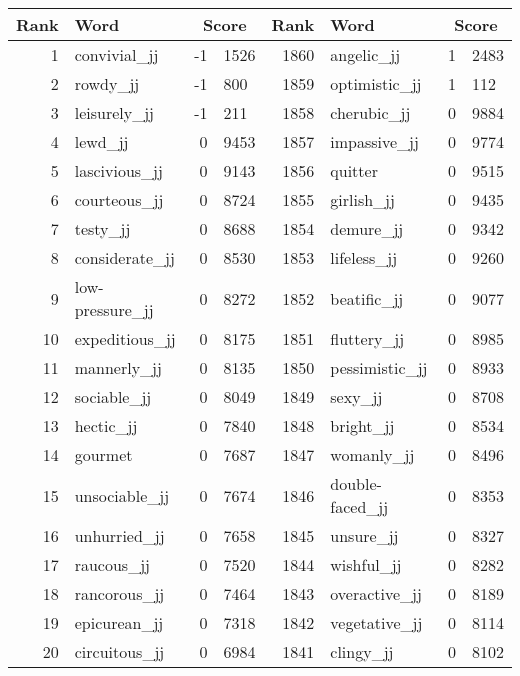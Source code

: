 \begin{table}[tbp]
    \begin{tabular}{| rlr@{.}l | rlr@{.}l |}
    \hline
    \textbf{Rank} & \textbf{Word} & \multicolumn{2}{c|}{\textbf{Score}} & \textbf{Rank} & \textbf{Word} & \multicolumn{2}{c|}{\textbf{Score}} \\
    \hline
    1 & convivial\_jj & -1 & 1526    &    1860 & angelic\_jj & 1 & 2483 \\
    2 & rowdy\_jj & -1 & 800    &    1859 & optimistic\_jj & 1 & 112 \\
    3 & leisurely\_jj & -1 & 211    &    1858 & cherubic\_jj & 0 & 9884 \\
    4 & lewd\_jj & 0 & 9453    &    1857 & impassive\_jj & 0 & 9774 \\
    5 & lascivious\_jj & 0 & 9143    &    1856 & quitter & 0 & 9515 \\
    6 & courteous\_jj & 0 & 8724    &    1855 & girlish\_jj & 0 & 9435 \\
    7 & testy\_jj & 0 & 8688    &    1854 & demure\_jj & 0 & 9342 \\
    8 & considerate\_jj & 0 & 8530    &    1853 & lifeless\_jj & 0 & 9260 \\
    9 & low-pressure\_jj & 0 & 8272    &    1852 & beatific\_jj & 0 & 9077 \\
    10 & expeditious\_jj & 0 & 8175    &    1851 & fluttery\_jj & 0 & 8985 \\
    11 & mannerly\_jj & 0 & 8135    &    1850 & pessimistic\_jj & 0 & 8933 \\
    12 & sociable\_jj & 0 & 8049    &    1849 & sexy\_jj & 0 & 8708 \\
    13 & hectic\_jj & 0 & 7840    &    1848 & bright\_jj & 0 & 8534 \\
    14 & gourmet & 0 & 7687    &    1847 & womanly\_jj & 0 & 8496 \\
    15 & unsociable\_jj & 0 & 7674    &    1846 & double-faced\_jj & 0 & 8353 \\
    16 & unhurried\_jj & 0 & 7658    &    1845 & unsure\_jj & 0 & 8327 \\
    17 & raucous\_jj & 0 & 7520    &    1844 & wishful\_jj & 0 & 8282 \\
    18 & rancorous\_jj & 0 & 7464    &    1843 & overactive\_jj & 0 & 8189 \\
    19 & epicurean\_jj & 0 & 7318    &    1842 & vegetative\_jj & 0 & 8114 \\
    20 & circuitous\_jj & 0 & 6984    &    1841 & clingy\_jj & 0 & 8102 \\

\end{tabular}
\end{table}
